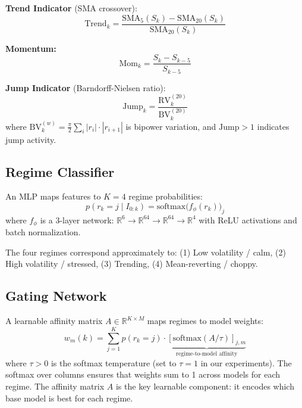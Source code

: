 \documentclass[11pt]{article}
\newcommand{\R}{\mathbb{R}}
\begin{document}
\textbf{Trend Indicator} (SMA crossover):
\begin{equation}
    \mathrm{Trend}_k = \frac{\mathrm{SMA}_5(S_k) - \mathrm{SMA}_{20}(S_k)}{\mathrm{SMA}_{20}(S_k)}
\end{equation}

\textbf{Momentum:}
\begin{equation}
    \mathrm{Mom}_k = \frac{S_k - S_{k-5}}{S_{k-5}}
\end{equation}

\textbf{Jump Indicator} (Barndorff-Nielsen ratio):
\begin{equation}
    \mathrm{Jump}_k = \frac{\mathrm{RV}_k^{(20)}}{\mathrm{BV}_k^{(20)}}
\end{equation}
where $\mathrm{BV}_k^{(w)} = \frac{\pi}{2} \sum_{i} |r_i| \cdot |r_{i+1}|$ is bipower variation, and $\mathrm{Jump} > 1$ indicates jump activity.

\subsection{Regime Classifier}

An MLP maps features to $K = 4$ regime probabilities:
\begin{equation}
    p(r_k = j \mid I_{0:k}) = \mathrm{softmax}\bigl(f_\phi(r_k)\bigr)_j
\end{equation}
where $f_\phi$ is a 3-layer network: $\R^6 \to \R^{64} \to \R^{64} \to \R^4$ with ReLU activations and batch normalization.

The four regimes correspond approximately to: (1) Low volatility / calm, (2) High volatility / stressed, (3) Trending, (4) Mean-reverting / choppy.

\subsection{Gating Network}

A learnable affinity matrix $A \in \R^{K \times M}$ maps regimes to model weights:
\begin{equation}
    w_m(k) = \sum_{j=1}^{K} p(r_k = j) \cdot \underbrace{[\mathrm{softmax}(A/\tau)]_{j,m}}_{\text{regime-to-model affinity}}
    \label{eq:gating}
\end{equation}
where $\tau > 0$ is the softmax temperature (set to $\tau = 1$ in our experiments).  The softmax over columns ensures that weights sum to 1 across models for each regime.  The affinity matrix $A$ is the key learnable component: it encodes which base model is best for each regime.
\end{document}
